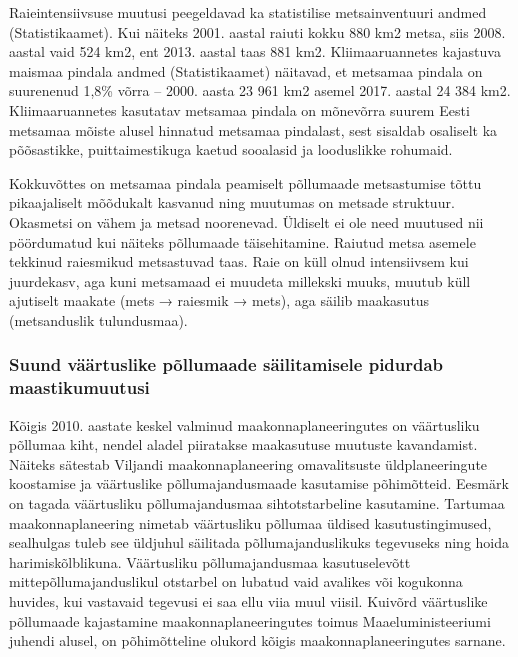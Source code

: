 \documentclass[estonian,]{article}
\begin{document}
Raieintensiivsuse muutusi peegeldavad ka statistilise metsainventuuri andmed (Statistikaamet). Kui näiteks 2001. aastal raiuti kokku 880 km2 metsa, siis 2008. aastal vaid 524 km2, ent 2013. aastal taas 881 km2. Kliimaaruannetes kajastuva maismaa pindala andmed (Statistikaamet) näitavad, et metsamaa pindala on suurenenud 1,8\% võrra -- 2000. aasta 23 961 km2 asemel 2017. aastal 24 384 km2. Kliimaaruannetes kasutatav metsamaa pindala on mõnevõrra suurem Eesti metsamaa mõiste alusel hinnatud metsamaa pindalast, sest sisaldab osaliselt ka põõsastikke, puittaimestikuga kaetud sooalasid ja looduslikke rohumaid.

Kokkuvõttes on metsamaa pindala peamiselt põllumaade metsastumise tõttu pikaajaliselt mõõdukalt kasvanud ning muutumas on metsade struktuur. Okasmetsi on vähem ja metsad noorenevad. Üldiselt ei ole need muutused nii pöördumatud kui näiteks põllumaade täisehitamine. Raiutud metsa asemele tekkinud raiesmikud metsastuvad taas. Raie on küll olnud intensiivsem kui juurdekasv, aga kuni metsamaad ei muudeta millekski muuks, muutub küll ajutiselt maakate (mets → raiesmik → mets), aga säilib maakasutus (metsanduslik tulundusmaa).

\hypertarget{suund-vuxe4uxe4rtuslike-puxf5llumaade-suxe4ilitamisele-pidurdab-maastikumuutusi}{%
\subsubsection*{Suund väärtuslike põllumaade säilitamisele pidurdab maastikumuutusi}\label{suund-vuxe4uxe4rtuslike-puxf5llumaade-suxe4ilitamisele-pidurdab-maastikumuutusi}}

Kõigis 2010. aastate keskel valminud maakonnaplaneeringutes on väärtusliku põllumaa kiht, nendel aladel piiratakse maakasutuse muutuste kavandamist. Näiteks sätestab Viljandi maakonnaplaneering omavalitsuste üldplaneeringute koostamise ja väärtuslike põllumajandusmaade kasutamise põhimõtteid. Eesmärk on tagada väärtusliku põllumajandusmaa sihtotstarbeline kasutamine. Tartumaa maakonnaplaneering nimetab väärtusliku põllumaa üldised kasutustingimused, sealhulgas tuleb see üldjuhul säilitada põllumajanduslikuks tegevuseks ning hoida harimiskõlblikuna. Väärtusliku põllumajandusmaa kasutuselevõtt mittepõllumajanduslikul otstarbel on lubatud vaid avalikes või kogukonna huvides, kui vastavaid tegevusi ei saa ellu viia muul viisil. Kuivõrd väärtuslike põllumaade kajastamine maakonnaplaneeringutes toimus Maaeluministeeriumi juhendi alusel, on põhimõtteline olukord kõigis maakonnaplaneeringutes sarnane.
\end{document}
